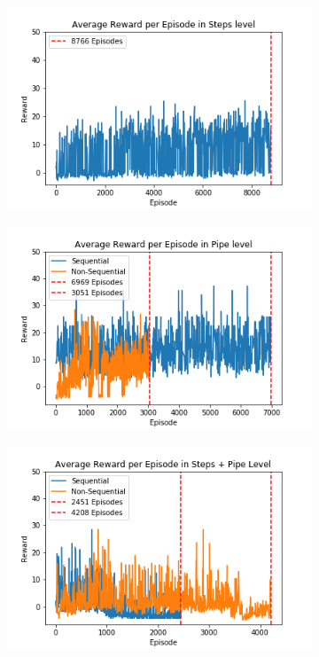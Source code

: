 \documentclass[notitlepage,a4paper,11pt]{article}
\begin{document}
\begin{figure}[htb!]
     \centering
     \begin{subfigure}[t]{0.32\textwidth}
         \centering
         \includegraphics[width=\textwidth]{figs/fun_results_1.png}
         \caption{}
         \label{fig:fun_results_1}
     \end{subfigure}
     \hfill
     \begin{subfigure}[t]{0.32\textwidth}
         \centering
         \includegraphics[width=\textwidth]{figs/fun_results_2.png}
         \caption{}
         \label{fig:fun_results_2}
     \end{subfigure}
     \hfill
     \begin{subfigure}[t]{0.32\textwidth}
         \centering
         \includegraphics[width=\textwidth]{figs/fun_results_3.png}

\end{subfigure}
\end{figure}
\end{document}
